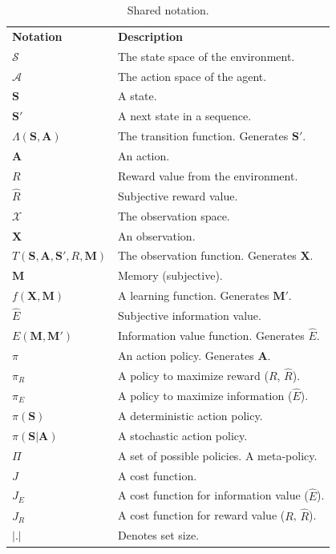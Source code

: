 \begin{table}[]
	\caption{Shared notation.}
    \begin{tabular}{ll}
	\textbf{Notation} & \textbf{Description} \\
    $\mathcal{S}$ & The state space of the environment. \\
    $\mathcal{A}$ & The action space of the agent. \\
    $\mathbf{S}$ & A state. \\
    $\mathbf{S'}$ & A next state in a sequence. \\
    $\Lambda(\mathbf{S},\mathbf{A})$ & The transition function. Generates $\mathbf{S'}$. \\
    $\mathbf{A}$ & An action. \\
    $R$ & Reward value from the environment. \\
    $\hat R$ & Subjective reward value. \\
    $\mathcal{X}$ & The observation space. \\
    $\mathbf{X}$ & An observation. \\
    $T(\mathbf{S},\mathbf{A},\mathbf{S'},R,\mathbf{M})$ & The observation function. Generates $\mathbf{X}$. \\
    $\mathbf{M}$ & Memory (subjective). \\
    $f(\mathbf{\mathbf{X},M})$ & A learning function. Generates $\mathbf{M'}$. \\
    $\hat E$ & Subjective information value. \\
    $E(\mathbf{M},\mathbf{M'})$ & Information value function. Generates $\hat E$. \\
    $\pi$ & An action policy. Generates $\mathbf{A}$. \\
    $\pi_R$ & A policy to maximize reward ($R$, $\hat R$). \\
    $\pi_E$ & A policy to maximize information ($\hat E$). \\
    $\pi(\mathbf{S})$ & A deterministic action policy. \\
    $\pi(\mathbf{S}|\mathbf{A})$ & A stochastic action policy. \\
    $\Pi$ & A set of possible policies. A meta-policy. \\
    $J$ & A cost function. \\
    $J_E$ & A cost function for information value ($\hat E$). \\
    $J_R$ & A cost function for reward value ($R$, $\hat R$). \\
    $|.|$ & Denotes set size. \\

\end{tabular}
\end{table}
